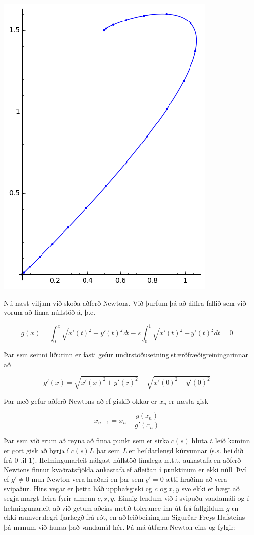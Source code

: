 \documentclass{article}
\begin{document}
\begin{center}
\includegraphics[scale=0.7]{20pt4}
\end{center}

\vspace*{0.5cm}

Nú næst viljum við skoða aðferð Newtons. Við þurfum þá að diffra fallið sem við vorum að finna núllstöð á, þ.e. 

\[g(x) = \int_0^x \sqrt{x'(t)^2 + y'(t)^2}dt - s\int_0^1 \sqrt{x'(t)^2 + y'(t)^2}dt = 0\]

Þar sem seinni liðurinn er fasti gefur undirstöðusetning stærðfræðigreiningarinnar að

\[g'(x) = \sqrt{x'(x)^2 + y'(x)^2} - \sqrt{x'(0)^2 + y'(0)^2}\]

Þar með gefur aðferð Newtons að ef giskið okkar er $x_n$ er næsta gisk

\[x_{n + 1} = x_n - \frac{g(x_n)}{g'(x_n)}\]

Þar sem við erum að reyna að finna punkt sem er sirka $c(s)$ hluta á leið kominn er gott gisk að byrja í $c(s)L$ þar sem $L$ er heildarlengd kúrvunnar (s.s. heildið frá 0 til 1). Helmingunarleit nálgast núllstöð línulega m.t.t. aukastafa en aðferð Newtons finnur kvaðratsfjölda aukastafa ef afleiðan í punktinum er ekki núll. Því ef $g' \neq 0$ mun Newton vera hraðari en þar sem $g' = 0$ ætti hraðinn að vera svipaður. Hins vegar er þetta háð upphafsgiski og $c$ og $x, y$ svo ekki er hægt að segja margt fleira fyrir almenn $c, x, y$. Einnig lendum við í svipuðu vandamáli og í helmingunarleit að við getum aðeins metið tolerance-inn út frá fallgildum $g$ en ekki raunverulegri fjarlægð frá rót, en að leiðbeiningum Sigurðar Freys Hafsteins þá munum við hunsa það vandamál hér. Þá má útfæra Newton eins og fylgir: \\
\end{document}
